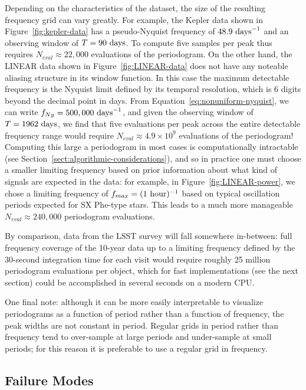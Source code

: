 \documentclass[preprint]{aastex}
\newcommand{\fig}[1]{Figure~\ref{fig:#1}}
\newcommand{\Eq}[1]{Equation~\ref{eq:#1}}
\newcommand{\eq}[1]{\Eq{#1}}
\newcommand{\Sect}[1]{Section~\ref{sect:#1}}
\newcommand{\sect}[1]{\Sect{#1}}
\newcommand{\sectlabel}[1]{\label{sect:#1}}
\begin{document}
Depending on the characteristics of the dataset, the size of the resulting
frequency grid can vary greatly.
For example, the Kepler data shown in \fig{kepler-data} has a pseudo-Nyquist
frequency of $48.9\ {\rm days}^{-1}$ and
an observing window of $T = 90\ {\rm days}$.
To compute five samples per peak thus requires $N_{eval} \approx 22,000$
evaluations of the periodogram.
On the other hand, the LINEAR data shown in \fig{LINEAR-data} does not have
any noteable aliasing structure in its window function.
In this case the maximum detectable frequency is the Nyquist limit defined
by its temporal resolution, which is 6 digits beyond the decimal point in days.
From \eq{nonuniform-nyquist}, we can write $f_{Ny} = 500,000\ {\rm days}^{-1}$,
and given the observing window of $T = 1962\ {\rm days}$, we find that five
evaluations per peak across the entire detectable frequency range
would require $N_{eval} \approx 4.9 \times 10^9$ evaluations of the periodogram!
Computing this large a periodogram in most cases is computationally intractable
(see \sect{algorithmic-considerations}), and so in practice one must choose
a smaller limiting frequency based on prior information about what kind of
signals are expected in the data: for example, in \fig{LINEAR-power}, we chose
a limiting frequency of $f_{max} = (1\ {\rm hour})^{-1}$ based on typical
oscillation periods expected for SX Phe-type stars.
This leads to a much more manageable
$N_{eval} \approx 240,000$ periodogram evaluations.

By comparison, data from the LSST survey \citep{Ivezic08LSST}
will fall somewhere in-between: full frequency coverage of
the 10-year data up to a limiting frequency defined by the 30-second
integration time for each visit would require roughly 25 million
periodogram evaluations per object, which for fast implementations
(see the next section) could be accomplished in several seconds on
a modern CPU.

One final note: although it can be more easily interpretable to
visualize periodograms as a function of period rather than a function of
frequency, the peak widths are not constant in period.
Regular grids in period rather than frequency tend to over-sample
at large periods and under-sample at small periods;
for this reason it is preferable to use a regular grid in frequency.

\subsection{Failure Modes}
\sectlabel{failure-modes}
\end{document}
